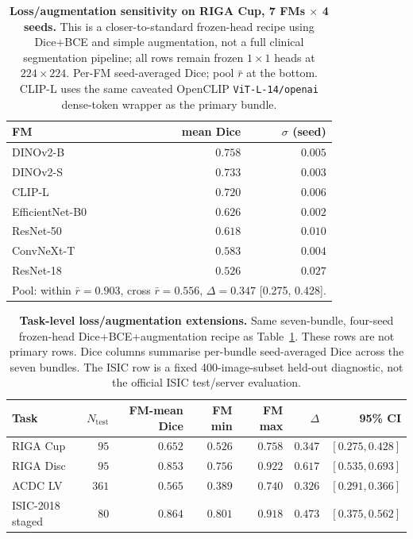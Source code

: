 \begin{table}[!htbp]
  \caption{\textbf{Loss/augmentation sensitivity on RIGA Cup, 7 FMs $\times$ 4 seeds.} This is a closer-to-standard frozen-head recipe using Dice+BCE and simple augmentation, not a full clinical segmentation pipeline; all rows remain frozen $1{\times}1$ heads at $224{\times}224$. Per-FM seed-averaged Dice; pool $\bar r$ at the bottom. CLIP-L uses the same caveated OpenCLIP \texttt{ViT-L-14/openai} dense-token wrapper as the primary bundle.}
  \label{tab:m14}
  \centering\small
  \begin{tabular}{lrr}
    \toprule
    FM & mean Dice & $\sigma$ (seed) \\
    \midrule
    DINOv2-B        & $0.758$ & $0.005$ \\
    DINOv2-S        & $0.733$ & $0.003$ \\
    CLIP-L          & $0.720$ & $0.006$ \\
    EfficientNet-B0 & $0.626$ & $0.002$ \\
    ResNet-50       & $0.618$ & $0.010$ \\
    ConvNeXt-T      & $0.583$ & $0.004$ \\
    ResNet-18       & $0.526$ & $0.027$ \\
    \midrule
    \multicolumn{3}{l}{Pool: within $\bar r{=}0.903$, cross $\bar r{=}0.556$, $\Delta{=}0.347$ [0.275, 0.428].} \\
    \bottomrule
  \end{tabular}
\end{table}

\begin{table}[!htbp]
  \caption{\textbf{Task-level loss/augmentation extensions.} Same seven-bundle, four-seed frozen-head Dice+BCE+augmentation recipe as Table~\ref{tab:m14}. These rows are not primary rows. Dice columns summarise per-bundle seed-averaged Dice across the seven bundles. The ISIC row is a fixed 400-image-subset held-out diagnostic, not the official ISIC test/server evaluation.}
  \label{tab:m14-ext}
  \centering\small
  \begin{tabular}{lrrrrrr}
    \toprule
    Task & $N_{\mathrm{test}}$ & FM-mean Dice & FM min & FM max & $\Delta$ & 95\% CI \\
    \midrule
    RIGA Cup        & $95$  & $0.652$ & $0.526$ & $0.758$ & $0.347$ & $[0.275, 0.428]$ \\
    RIGA Disc       & $95$  & $0.853$ & $0.756$ & $0.922$ & $0.617$ & $[0.535, 0.693]$ \\
    ACDC LV         & $361$ & $0.565$ & $0.389$ & $0.740$ & $0.326$ & $[0.291, 0.366]$ \\
    ISIC-2018 staged & $80$  & $0.864$ & $0.801$ & $0.918$ & $0.473$ & $[0.375, 0.562]$ \\
    \bottomrule
  \end{tabular}
\end{table}

